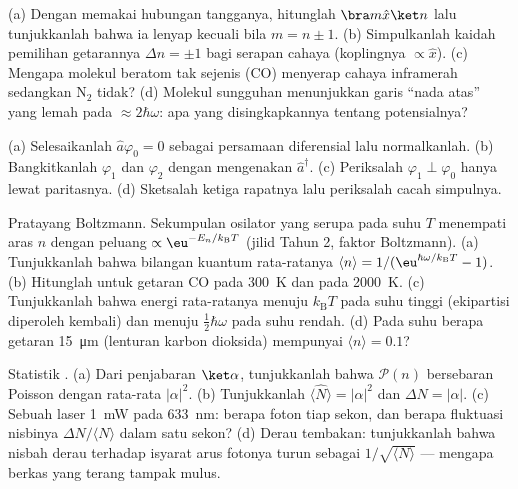\begin{exercise}[$\star$]\label{exo:b3:harmonic-oscillator:4}
(a) Dengan memakai hubungan tangganya, hitunglah $\bra m\hat x\ket n$
lalu tunjukkanlah bahwa ia lenyap kecuali bila $m = n \pm 1$. (b)
Simpulkanlah kaidah pemilihan getarannya $\Delta n = \pm1$ bagi serapan
cahaya (koplingnya $\propto\hat x$). (c) Mengapa molekul beratom tak
sejenis (CO) menyerap cahaya inframerah sedangkan N$_2$ tidak? (d)
Molekul sungguhan menunjukkan garis ``nada atas'' yang lemah pada
$\approx 2\hbar\omega$: apa yang disingkapkannya tentang potensialnya?
\end{exercise}

\begin{exercise}[$\star\star$]\label{exo:b3:harmonic-oscillator:5}
(a) Selesaikanlah $\hat a\varphi_0 = 0$ sebagai persamaan diferensial
lalu normalkanlah. (b) Bangkitkanlah $\varphi_1$ dan $\varphi_2$ dengan
mengenakan $\hat a^\dagger$. (c) Periksalah $\varphi_1 \perp \varphi_0$
hanya lewat paritasnya. (d) Sketsalah ketiga rapatnya lalu periksalah
cacah simpulnya.
\end{exercise}

\begin{exercise}[$\star\star$]\label{exo:b3:harmonic-oscillator:6}
Pratayang Boltzmann. Sekumpulan osilator yang serupa pada suhu $T$
menempati aras $n$ dengan peluang $\propto
\eu^{-E_n/k_{\text{B}}T}$ (jilid Tahun 2, faktor Boltzmann). (a)
Tunjukkanlah bahwa bilangan kuantum rata-ratanya $\langle n\rangle =
1/(\eu^{\hbar\omega/k_{\text{B}}T} - 1)$. (b) Hitunglah untuk getaran
CO pada \qty{300}{K} dan pada \qty{2000}{K}. (c) Tunjukkanlah bahwa
energi rata-ratanya menuju $k_{\text{B}}T$ pada suhu tinggi (ekipartisi
diperoleh kembali) dan menuju $\tfrac12\hbar\omega$ pada suhu rendah.
(d) Pada suhu berapa getaran \qty{15}{\micro m} (lenturan karbon
dioksida) mempunyai $\langle n\rangle = 0.1$?
\end{exercise}

\begin{exercise}[$\star\star$]\label{exo:b3:harmonic-oscillator:7}
Statistik . (a) Dari penjabaran $\ket\alpha$,
tunjukkanlah bahwa $\mathcal P(n)$ bersebaran Poisson dengan rata-rata
$|\alpha|^2$. (b) Tunjukkanlah $\langle\hat N\rangle = |\alpha|^2$ dan
$\Delta N = |\alpha|$. (c) Sebuah laser \qty{1}{mW} pada \qty{633}{nm}:
berapa foton tiap sekon, dan berapa fluktuasi nisbinya
$\Delta N/\langle N\rangle$ dalam satu sekon? (d) Derau tembakan:
tunjukkanlah bahwa nisbah derau terhadap isyarat arus fotonya turun
sebagai $1/\sqrt{\langle N\rangle}$ --- mengapa berkas yang terang
tampak mulus.
\end{exercise}

